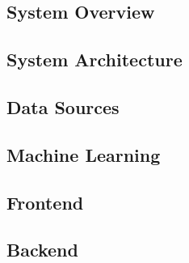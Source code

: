 \subsection{System Overview}


\subsection{System Architecture} \label{systemarchitecture}


\subsection{Data Sources}


\subsection{Machine Learning}


\subsection{Frontend}


\subsection{Backend}
